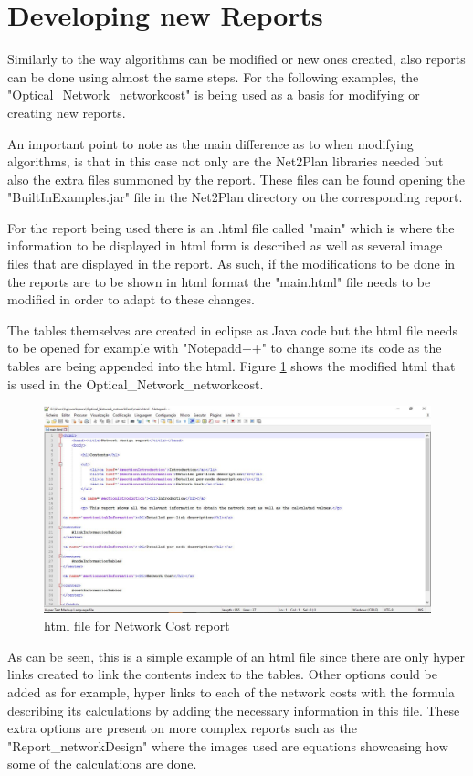 	\newpage

	\section{Developing new Reports}
	Similarly to the way algorithms can be modified or new ones created, also reports can be done using almost the same steps. For the following examples, the "Optical\_Network\_networkcost" is being used as a basis for modifying or creating new reports.

	An important point to note as the main difference as to when modifying algorithms, is that in this case not only are the Net2Plan libraries needed but also the extra files summoned by the report. These files can be found opening the "BuiltInExamples.jar" file in the Net2Plan directory on the corresponding report.

	For the report being used there is an .html file called "main" which is where the information to be displayed in html form is described as well as several image files that are displayed in the report. As such, if the modifications to be done in the reports are to be shown in html format the "main.html" file needs to be modified in order to adapt to these changes.
	
	The tables themselves are created in eclipse as Java code but the html file needs to be opened for example with "Notepadd++" to change some its code as the tables are being appended into the html. Figure \ref{html_report} shows the modified html that is used in the Optical\_Network\_networkcost.
	
	\begin{figure}[h!]
		\centering
		\includegraphics[width = 17cm]{html_report.pdf}
		\caption{html file for Network Cost report}
		\label{html_report}
	\end{figure}	
		
	As can be seen, this is a simple example of an html file since there are only hyper links created to link the contents index to the tables. Other options could be added as for example, hyper links to each of the network costs with the formula describing its calculations by adding the necessary information in this file. These extra options are present on more complex reports such as the "Report\_networkDesign" where the images used are equations showcasing how some of the calculations are done.
	
\clearpage
